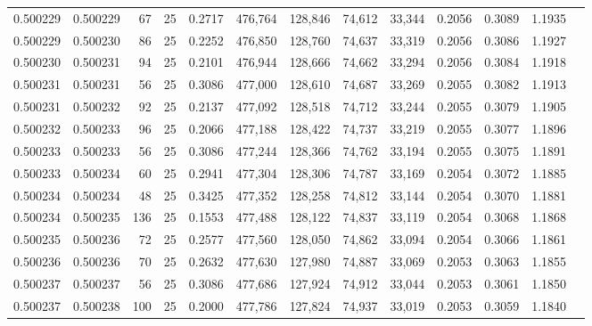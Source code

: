 \begin{tabular}{rrrrrrrrrrrrr}
0.500229 & 0.500229 &  67 &  25 &                                     0.2717 & 476,764 & 128,846 &  74,612 &  33,344 & 0.2056 & 0.3089 & 1.1935 \\
0.500229 & 0.500230 &  86 &  25 &                                     0.2252 & 476,850 & 128,760 &  74,637 &  33,319 & 0.2056 & 0.3086 & 1.1927 \\
0.500230 & 0.500231 &  94 &  25 &                                     0.2101 & 476,944 & 128,666 &  74,662 &  33,294 & 0.2056 & 0.3084 & 1.1918 \\
0.500231 & 0.500231 &  56 &  25 &                                     0.3086 & 477,000 & 128,610 &  74,687 &  33,269 & 0.2055 & 0.3082 & 1.1913 \\
0.500231 & 0.500232 &  92 &  25 &                                     0.2137 & 477,092 & 128,518 &  74,712 &  33,244 & 0.2055 & 0.3079 & 1.1905 \\
0.500232 & 0.500233 &  96 &  25 &                                     0.2066 & 477,188 & 128,422 &  74,737 &  33,219 & 0.2055 & 0.3077 & 1.1896 \\
0.500233 & 0.500233 &  56 &  25 &                                     0.3086 & 477,244 & 128,366 &  74,762 &  33,194 & 0.2055 & 0.3075 & 1.1891 \\
0.500233 & 0.500234 &  60 &  25 &                                     0.2941 & 477,304 & 128,306 &  74,787 &  33,169 & 0.2054 & 0.3072 & 1.1885 \\
0.500234 & 0.500234 &  48 &  25 &                                     0.3425 & 477,352 & 128,258 &  74,812 &  33,144 & 0.2054 & 0.3070 & 1.1881 \\
0.500234 & 0.500235 & 136 &  25 &                                     0.1553 & 477,488 & 128,122 &  74,837 &  33,119 & 0.2054 & 0.3068 & 1.1868 \\
0.500235 & 0.500236 &  72 &  25 &                                     0.2577 & 477,560 & 128,050 &  74,862 &  33,094 & 0.2054 & 0.3066 & 1.1861 \\
0.500236 & 0.500236 &  70 &  25 &                                     0.2632 & 477,630 & 127,980 &  74,887 &  33,069 & 0.2053 & 0.3063 & 1.1855 \\
0.500237 & 0.500237 &  56 &  25 &                                     0.3086 & 477,686 & 127,924 &  74,912 &  33,044 & 0.2053 & 0.3061 & 1.1850 \\
0.500237 & 0.500238 & 100 &  25 &                                     0.2000 & 477,786 & 127,824 &  74,937 &  33,019 & 0.2053 & 0.3059 & 1.1840 \\

\end{tabular}
